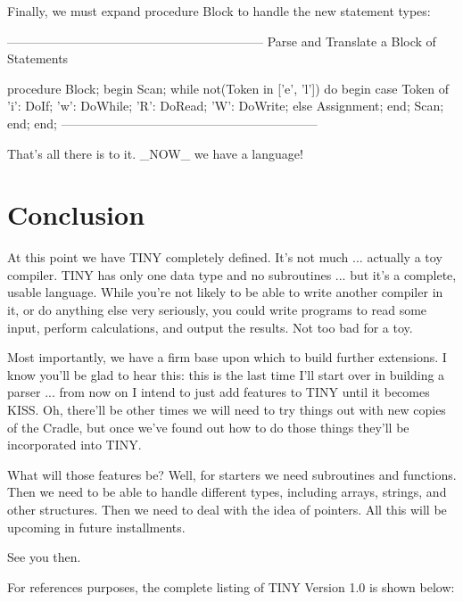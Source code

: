 \documentclass[float=false, crop=false]{standalone}
\begin{document}
Finally,  we  must  expand  procedure  Block  to  handle the  new
statement types:

\begin{code}
{--------------------------------------------------------------}
{ Parse and Translate a Block of Statements }

procedure Block;
begin
   Scan;
   while not(Token in ['e', 'l']) do begin
      case Token of
       'i': DoIf;
       'w': DoWhile;
       'R': DoRead;
       'W': DoWrite;
      else Assignment;
      end;
      Scan;
   end;
end;
{--------------------------------------------------------------}
\end{code}

That's all there is to it.  _NOW_ we have a language!

\section{Conclusion}

At this point we have TINY completely defined. It's not much ... actually a toy
compiler. TINY has only one data type and no subroutines ... but it's a
complete, usable language. While you're not likely to be able to write another
compiler in it, or do anything else very seriously, you could write programs to
read some input, perform calculations, and output the results. Not too bad for a
toy.

Most importantly, we have a firm base upon which to build further extensions. I
know you'll be glad to hear this: this is the last time I'll start over in
building a parser ... from now on I intend to just add features to TINY until it
becomes KISS. Oh, there'll be other times we will need to try things out with
new copies of the Cradle, but once we've found out how to do those things
they'll be incorporated into TINY.

What  will  those  features  be?    Well,  for starters  we  need
subroutines and functions.    Then  we  need to be able to handle
different types, including arrays, strings, and other structures.
Then we need to deal with the idea of pointers.  All this will be
upcoming in future installments.

See you then.

For references purposes, the complete listing of TINY Version 1.0 is shown
below:
\end{document}
